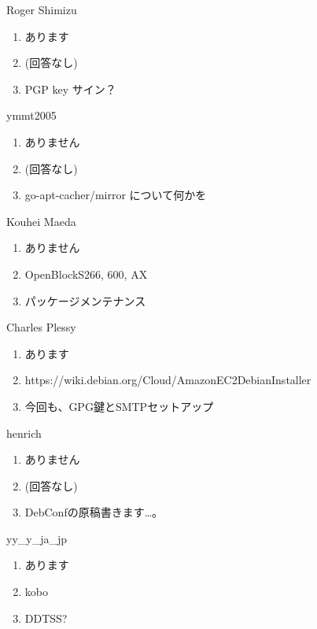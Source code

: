 \begin{prework}{ Roger Shimizu }
  \begin{enumerate}
  \item あります
  \item (回答なし)
  \item PGP key サイン？
  \end{enumerate}
\end{prework}

\begin{prework}{ ymmt2005 }
  \begin{enumerate}
  \item ありません
  \item (回答なし)
  \item go-apt-cacher/mirror について何かを
  \end{enumerate}
\end{prework}

\begin{prework}{ Kouhei Maeda }
  \begin{enumerate}
  \item ありません
  \item OpenBlockS266, 600, AX
  \item パッケージメンテナンス
  \end{enumerate}
\end{prework}

\begin{prework}{ Charles Plessy }
  \begin{enumerate}
  \item あります
  \item https://wiki.debian.org/Cloud/AmazonEC2DebianInstaller
  \item 今回も、GPG鍵とSMTPセットアップ
  \end{enumerate}
\end{prework}

\begin{prework}{ henrich }
  \begin{enumerate}
  \item ありません
  \item (回答なし)
  \item DebConfの原稿書きます…。
  \end{enumerate}
\end{prework}

\begin{prework}{ yy\_y\_ja\_jp }
  \begin{enumerate}
  \item あります
  \item kobo
  \item DDTSS?
  \end{enumerate}
\end{prework}
